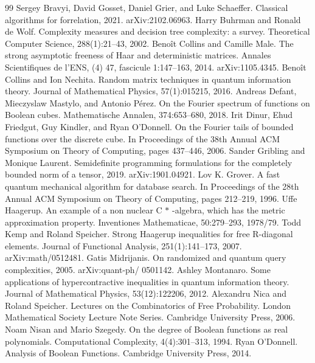 \documentclass[10pt,a4paper]{article}
\begin{document}
\begin{thebibliography}{99}
 Sergey Bravyi, David Gosset, Daniel Grier, and Luke Schaeffer. Classical algorithms for forrelation, 2021. arXiv:2102.06963.
 Harry Buhrman and Ronald de Wolf. Complexity measures and decision tree complexity: a survey. Theoretical Computer Science, 288(1):21–43, 2002.
 Benoît Collins and Camille Male. The strong asymptotic freeness of Haar and deterministic matrices. Annales Scientifiques de l’ENS, (4) 47, fascicule 1:147–163, 2014. arXiv:1105.4345.
 Benoît Collins and Ion Nechita. Random matrix techniques in quantum information theory. Journal of Mathematical Physics, 57(1):015215, 2016.
 Andreas Defant, Mieczyslaw Mastylo, and Antonio Pérez. On the Fourier spectrum of functions on Boolean cubes. Mathematische Annalen, 374:653–680, 2018.
 Irit Dinur, Ehud Friedgut, Guy Kindler, and Ryan O’Donnell. On the Fourier tails of bounded functions over the discrete cube. In Proceedings of the 38th Annual ACM Symposium on Theory of Computing, pages 437–446, 2006.
 Sander Gribling and Monique Laurent. Semidefinite programming formulations for the completely bounded norm of a tensor, 2019. arXiv:1901.04921.
 Lov K. Grover. A fast quantum mechanical algorithm for database search. In Proceedings of the 28th Annual ACM Symposium on Theory of Computing, pages 212–219, 1996.
 Uffe Haagerup. An example of a non nuclear C $\ast$ -algebra, which has the metric approximation property. Inventiones Mathematicae, 50:279–293, 1978/79.
 Todd Kemp and Roland Speicher. Strong Haagerup inequalities for free R-diagonal elements. Journal of Functional Analysis, 251(1):141–173, 2007. arXiv:math/0512481.
 Gatis Midrijanis. On randomized and quantum query complexities, 2005. arXiv:quant-ph/ 0501142.
 Ashley Montanaro. Some applications of hypercontractive inequalities in quantum information theory. Journal of Mathematical Physics, 53(12):122206, 2012.
 Alexandru Nica and Roland Speicher. Lectures on the Combinatorics of Free Probability. London Mathematical Society Lecture Note Series. Cambridge University Press, 2006.
 Noam Nisan and Mario Szegedy. On the degree of Boolean functions as real polynomials. Computational Complexity, 4(4):301–313, 1994.
 Ryan O’Donnell. Analysis of Boolean Functions. Cambridge University Press, 2014.

\end{thebibliography}
\end{document}
